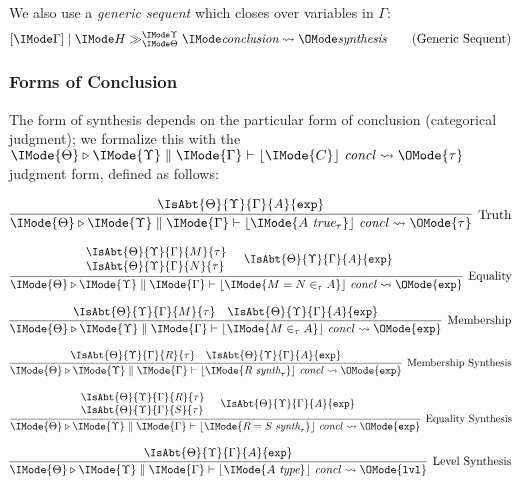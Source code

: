 We also use a \emph{generic sequent} which closes over variables in $\Gamma$:
\[
  \GenericPRLSequent{\Gamma}{H}{\Theta}{\Upsilon}{\textit{conclusion}}{\textit{synthesis}}
  \tag{Generic Sequent}
\]

\newcommand\IsConcl[5]{%
  \IMode{#1}\triangleright%
  \IMode{#2}\parallel%
  \IMode{#3}\vdash%
  \lfloor\IMode{#4}\rfloor\ \mathit{concl}%
  \leadsto \OMode{#5}%
}

\subsubsection{Forms of Conclusion}
The form of synthesis depends on the particular form of conclusion (categorical
judgment); we formalize this with the
$\IsConcl{\Theta}{\Upsilon}{\Gamma}{C}{\tau}$ judgment form, defined as
follows:

\[
  \infer[\text{Truth}]{
    \IsConcl{\Theta}{\Upsilon}{\Gamma}{A\ \textit{true}_\tau}{\tau}
  }{
    \IsAbt{\Theta}{\Upsilon}{\Gamma}{A}{\AbtSortExp}
  }
\]


\[
  \infer[\text{Equality}]{
    \IsConcl{\Theta}{\Upsilon}{\Gamma}{M = N \in_\tau A}{\AbtSortExp}
  }{
    \begin{array}{l}
      \IsAbt{\Theta}{\Upsilon}{\Gamma}{M}{\tau}\\
      \IsAbt{\Theta}{\Upsilon}{\Gamma}{N}{\tau}
    \end{array} &
    \IsAbt{\Theta}{\Upsilon}{\Gamma}{A}{\AbtSortExp}
  }
\]

\[
  \infer[\text{Membership}]{
    \IsConcl{\Theta}{\Upsilon}{\Gamma}{M \in_\tau A}{\AbtSortExp}
  }{
    \IsAbt{\Theta}{\Upsilon}{\Gamma}{M}{\tau} &
    \IsAbt{\Theta}{\Upsilon}{\Gamma}{A}{\AbtSortExp}
  }
\]

\[
  \infer[\text{Membership Synthesis}]{
    \IsConcl{\Theta}{\Upsilon}{\Gamma}{R\ \textit{synth}_\tau}{\AbtSortExp}
  }{
    \IsAbt{\Theta}{\Upsilon}{\Gamma}{R}{\tau} &
    \IsAbt{\Theta}{\Upsilon}{\Gamma}{A}{\AbtSortExp}
  }
\]

\[
  \infer[\text{Equality Synthesis}]{
    \IsConcl{\Theta}{\Upsilon}{\Gamma}{R = S\ \textit{synth}_\tau}{\AbtSortExp}
  }{
    \begin{array}{l}
      \IsAbt{\Theta}{\Upsilon}{\Gamma}{R}{\tau}\\
      \IsAbt{\Theta}{\Upsilon}{\Gamma}{S}{\tau}
    \end{array} &
    \IsAbt{\Theta}{\Upsilon}{\Gamma}{A}{\AbtSortExp}
  }
\]

\[
  \infer[\text{Level Synthesis}]{
    \IsConcl{\Theta}{\Upsilon}{\Gamma}{A\ \textit{type}}{\AbtSortLvl}
  }{
    \IsAbt{\Theta}{\Upsilon}{\Gamma}{A}{\AbtSortExp}
  }
\]

